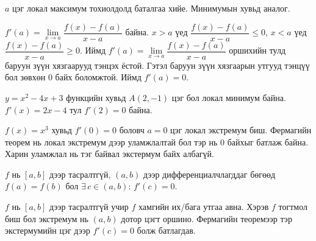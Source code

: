 \begin{prof} 
$a$ цэг локал максимум тохиолдолд баталгаа хийе. Минимумын хувьд аналог. 

$f'(a)=\lim\limits_{x\to a} \dfrac{f(x)-f(a)}{x-a}$ байна. 
$x>a$ үед $\dfrac{f(x)-f(a)}{x-a}\le 0$, $x<a$ үед $\dfrac{f(x)-f(a)}{x-a}\ge 0$. Иймд $f'(a)=\lim\limits_{x\to a} \dfrac{f(x)-f(a)}{x-a}$  оршихийн тулд баруун зүүн хязгаарууд тэнцэх ёстой. Гэтэл баруун зүүн  хязгаарын утгууд тэнцүү бол зөвхөн $0$ байх боломжтой. Иймд $f'(a)=0$. 
\end{prof}
\begin{example}
$y=x^2-4x+3$ функцийн хувьд $A(2,-1)$ цэг бол локал минимум байна. $f'(x)=2x-4$ тул $f'(2)=0$ байна.
\begin{center}
\end{center}
$f(x)=x^3$ хувьд $f'(0)=0$ боловч $a=0$ цэг локал экстремум биш. Фермагийн теорем нь локал экстремум дээр уламжлалтай бол тэр нь $0$ байхыг батлаж байна. Харин уламжлал нь тэг байвал экстермум байх албагүй.
\begin{center}
\end{center}

\end{example}
\begin{theorem}[Ролл]
$f$ нь $[a,b]$ дээр тасралтгүй, $(a,b)$ дээр дифференциалчлагддаг бөгөөд $f(a)=f(b)$ бол $\exists\,c\in(a,b)$: $f'(c)=0$.
\end{theorem}

\begin{prof}
$f$ нь $[a,b]$ дээр тасралтгүй учир $f$ хамгийн их/бага утгаа авна. Хэрэв $f$ тогтмол биш бол экстремум нь $(a,b)$ дотор цэгт оршино. Фермагийн теоремээр тэр экстермумийн цэг дээр $f'(c)=0$ болж батлагдав.
\end{prof}

